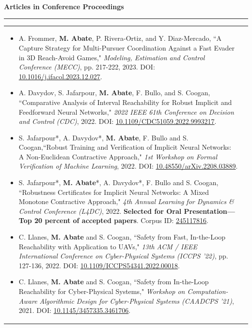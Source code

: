 \documentclass{article}
\begin{document}
\noindent\:\:\textbf{\large{Articles in Conference Proceedings}}
\vspace{.1cm}
\hrule
\begin{tabular}{ m{6.9in} m{0in}}
\begin{itemize}
\item[{[C17]}] A. Frommer, \textbf{M. Abate}, P. Rivera-Ortiz, and Y. Diaz-Mercado, ``A Capture Strategy for Multi-Pursuer Coordination Against a Fast Evader in 3D Reach-Avoid Games," \emph{Modeling, Estimation and Control Conference (MECC)}, pp. 217-222, 2023.  DOI: \href{https://doi.org/10.1016/j.ifacol.2023.12.027}{10.1016/j.ifacol.2023.12.027}.
%
\item[{[C16]}] A. Davydov, S. Jafarpour, \textbf{M. Abate}, F. Bullo, and S. Coogan, ``Comparative Analysis of Interval Reachability for Robust Implicit and Feedforward Neural Networks," \emph{2022 IEEE 61th Conference on Decision and Control (CDC)}, 2022.  DOI: \href{https://doi.org/10.1109/CDC51059.2022.9993217}{10.1109/CDC51059.2022.9993217}.
%
\item[{[C15]}] S. Jafarpour*, A. Davydov*, \textbf{M. Abate}, F. Bullo and S. Coogan,``Robust Training and Verification of Implicit Neural Networks: A Non-Euclidean Contractive Approach," \emph{1st Workshop on Formal Verification of Machine Learning}, 2022. DOI: 
\href{https://doi.org/10.48550/arXiv.2208.03889}{10.48550/arXiv.2208.03889}.

\item[{[C14]}] S. Jafarpour*, \textbf{M. Abate}*, A. Davydov*, F. Bullo and S. Coogan, ``Robustness Certificates for Implicit Neural Networks: A Mixed Monotone Contractive Approach," \emph{4th Annual Learning for Dynamics \& Control Conference (L4DC)}, 2022. \textbf{Selected for Oral Presentation---Top 20 percent of accepted papers}. Corpus ID: \href{https://www.semanticscholar.org/paper/Robustness-Certificates-for-Implicit-Neural-A-Mixed-Jafarpour-Abate/8e39945d82550adbe7833836f55dbb140b9312dd}{245117816}.
%
\item[{[C13]}] C. Llanes, \textbf{M. Abate} and S. Coogan, ``Safety from Fast, In-the-Loop Reachability with Application to UAVs," \emph{13th ACM / IEEE International Conference on Cyber-Physical Systems (ICCPS '22)}, pp. 127-136, 2022. DOI: \href{https://doi.org/10.1109/ICCPS54341.2022.00018}{10.1109/ICCPS54341.2022.00018}.
    \item[{[C12]}] C. Llanes, \textbf{M. Abate} and S. Coogan, ``Safety from In-the-Loop Reachability for Cyber-Physical Systems," \emph{Workshop on Computation-Aware Algorithmic Design for Cyber-Physical Systems (CAADCPS '21)}, 2021. DOI: \href{https://doi.org/10.1145/3457335.3461706}{10.1145/3457335.3461706}.
%
\end{itemize}
\end{tabular}
\end{document}
